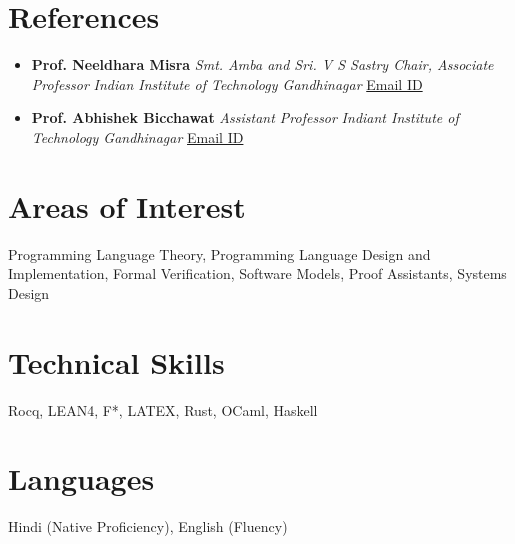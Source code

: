 \documentclass{moderncv}
\begin{document}
\section{References}
\label{sec:org88e1ef5}
\begin{itemize}
\item \textbf{Prof. Neeldhara Misra}
\emph{Smt. Amba and Sri. V S Sastry Chair, Associate Professor}
\emph{Indian Institute of Technology Gandhinagar}
\href{mailto:neeldhara.m@iitgn.ac.in}{Email ID}
\item \textbf{Prof. Abhishek Bicchawat}
\emph{Assistant Professor}
\emph{Indiant Institute of Technology Gandhinagar}
\href{mailto:abhishek.b@iitgn.ac.in}{Email ID}
\end{itemize}
\section{Areas of Interest}
\label{sec:org5319bb9}
Programming Language Theory, Programming Language Design and Implementation, Formal Verification, Software Models, Proof Assistants, Systems Design
\section{Technical Skills}
\label{sec:org330eb9e}
Rocq, LEAN4, F*, LATEX, Rust, OCaml, Haskell
\section{Languages}
\label{sec:orgee2f48d}
Hindi (Native Proficiency), English (Fluency)
\end{document}
